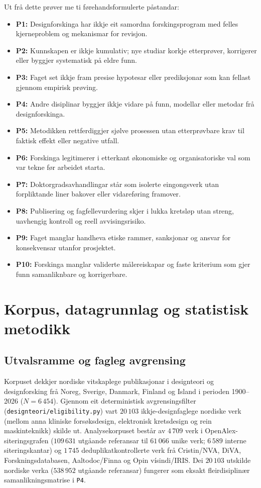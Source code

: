 \documentclass[11pt,a4paper]{article}
\begin{document}
Ut frå dette prøver me ti førehandsformulerte påstandar:
\begin{itemize}
  \item \textbf{P1:} Designforskinga har ikkje eit samordna forskingsprogram med felles kjerneproblem og mekanismar for revisjon.
  \item \textbf{P2:} Kunnskapen er ikkje kumulativ; nye studiar korkje etterprøver, korrigerer eller byggjer systematisk på eldre funn.
  \item \textbf{P3:} Faget set ikkje fram presise hypotesar eller prediksjonar som kan fellast gjennom empirisk prøving.
  \item \textbf{P4:} Andre disiplinar byggjer ikkje vidare på funn, modellar eller metodar frå designforskinga.
  \item \textbf{P5:} Metodikken rettferdiggjer sjølve prosessen utan etterprøvbare krav til faktisk effekt eller negative utfall.
  \item \textbf{P6:} Forskinga legitimerer i etterkant økonomiske og organisatoriske val som var tekne før arbeidet starta.
  \item \textbf{P7:} Doktorgradsavhandlingar står som isolerte eingongsverk utan forpliktande liner bakover eller vidareføring framover.
  \item \textbf{P8:} Publisering og fagfellevurdering skjer i lukka kretsløp utan streng, uavhengig kontroll og reell avvisingsrisiko.
  \item \textbf{P9:} Faget manglar handheva etiske rammer, sanksjonar og ansvar for konsekvensar utanfor prosjektet.
  \item \textbf{P10:} Forskinga manglar validerte målereiskapar og faste kriterium som gjer funn samanliknbare og korrigerbare.
\end{itemize}

\section{Korpus, datagrunnlag og statistisk metodikk}

\subsection{Utvalsramme og fagleg avgrensing}
Korpuset dekkjer nordiske vitskaplege publikasjonar i designteori og designforsking frå Noreg, Sverige, Danmark, Finland og Island i perioden 1900--2026 ($N = 6\,454$). Gjennom eit deterministisk avgrensingsfilter (\texttt{designteori/eligibility.py}) vart $20\,103$ ikkje-designfaglege nordiske verk (mellom anna kliniske forsøksdesign, elektronisk kretsdesign og rein maskinteknikk) skilde ut. Analysekorpuset består av $4\,709$ verk i OpenAlex-siteringsgrafen ($109\,631$ utgåande referansar til $61\,066$ unike verk; $6\,589$ interne siteringskantar) og $1\,745$ deduplikatkontrollerte verk frå Cristin/NVA, DiVA, Forskningsdatabasen, Aaltodoc/Finna og Opin vísindi/IRIS. Dei $20\,103$ utskilde nordiske verka ($538\,952$ utgåande referansar) fungerer som eksakt fleirdisiplinær samanlikningsmatrise i \texttt{P4}.
\end{document}
